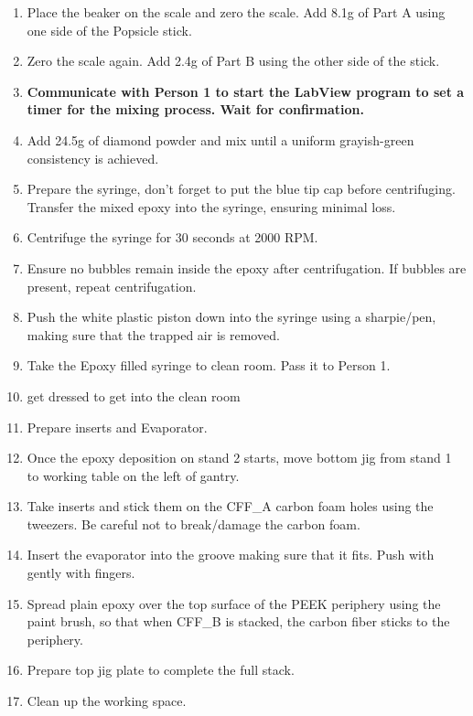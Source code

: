 \documentclass[12pt]{cornelltfpxsop}
\begin{document}
\begin{paracol}{2}
\begin{enumerate}
        \item Place the beaker on the scale and zero the scale. Add 8.1g of Part A using one side of the Popsicle stick.
        \item Zero the scale again. Add 2.4g of Part B using the other side of the stick.
        \item \textbf{Communicate with Person 1 to start the LabView program to set a timer for the mixing process. Wait for confirmation.}       
        \item Add 24.5g of diamond powder and mix until a uniform grayish-green\\ consistency is achieved.
        \item Prepare the syringe, don't forget to put the blue tip cap before centrifuging. Transfer the mixed epoxy into the syringe, ensuring minimal loss.
        \item Centrifuge the syringe for 30 seconds at 2000 RPM.
        \item Ensure no bubbles remain inside the epoxy after centrifugation. If bubbles are present, repeat centrifugation. 
        \item Push the white plastic piston down into the syringe using a sharpie/pen, making sure that the trapped air is removed. 
        \item Take the Epoxy filled syringe to clean room. Pass it to Person 1.
        \item get dressed to get into the clean room   
        \item Prepare inserts and Evaporator.
        \item Once the epoxy deposition on stand 2 starts, move bottom jig from stand 1 to working table on the left of gantry. 
        \item Take inserts and stick them on the  CFF\_A carbon foam holes using the tweezers. Be careful not to break/damage the carbon foam.
        \item Insert the evaporator into the groove making sure that it fits. Push with gently with fingers.
        \item Spread plain epoxy over the top surface of the PEEK periphery using the paint brush, so that when CFF\_B is stacked, the carbon fiber sticks to the periphery.  
        \item Prepare top jig plate to complete the full stack.
        \item Clean up the working space.
\switchcolumn %
\end{enumerate}
\end{paracol}
\end{document}
